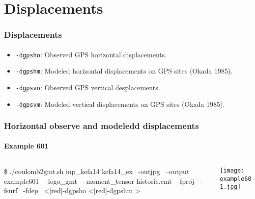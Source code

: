 \section[Displacements]{Displacements}

\graphicspath{{Chapter6/Figs/}}

\begin{frame}
  \frametitle{Displacements}
  \framesubtitle{}
  \label{fr6:terr_sat_ext}

\begin{itemize}
\item
  \texttt{-dgpsho}: Observed GPS horizontal displacements.
\item
  \texttt{-dgpshm}: Modeled horizontal displacements on GPS sites (Okada
  1985).
\item
  \texttt{-dgpsvo}: Observed GPS vertical desplacements.
\item
  \texttt{-dgpsvm}: Modeled vertical displacements on GPS sites (Okada
  1985).
\end{itemize}

\end{frame}
\note{}

\begin{frame}[t,fragile]
  \frametitle{Horizontal observe and modeledd displacements}
  \framesubtitle{Example 601}
  \label{ch5fr:ex601}
\begin{columns}[t]
  \begin{column}{.5\textwidth}
\begin{scriptsize}
\begin{verbnobox}[\vbdelim]
\$ ./coulomb2gmt.sh inp_kefa14 kefa14_ex \
                   -outjpg \ 
                   --output example601 \
                   --logo_gmt \
                   --moment_tensor historic.cmt \
                   -fproj \
                   -fsurf \
                   -fdep \
                   <[red]-dgpsho \>
                   <[red]-dgpshm >
\end{verbnobox}
\end{scriptsize}

  \end{column}
  \begin{column}{.5\textwidth}

\centering
  \texttt{[image: example601.jpg]}
  \end{column}
\end{columns}

\end{frame}
\note{}

